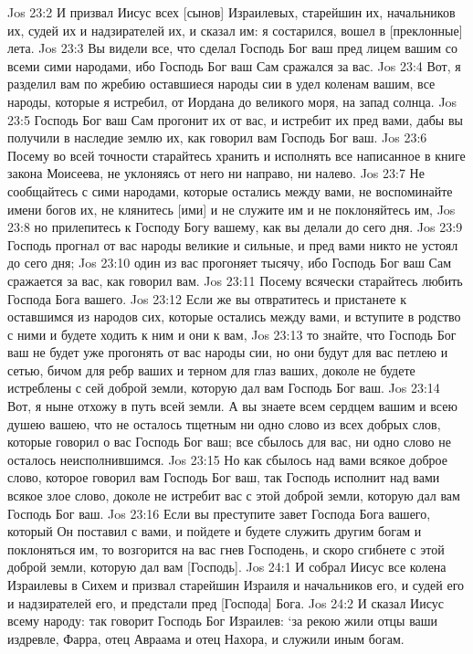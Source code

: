 Jos 23:2  И призвал Иисус всех [сынов] Израилевых, старейшин их, начальников их, судей их и надзирателей их, и сказал им: я состарился, вошел в [преклонные] лета.
Jos 23:3  Вы видели все, что сделал Господь Бог ваш пред лицем вашим со всеми сими народами, ибо Господь Бог ваш Сам сражался за вас.
Jos 23:4  Вот, я разделил вам по жребию оставшиеся народы сии в удел коленам вашим, все народы, которые я истребил, от Иордана до великого моря, на запад солнца.
Jos 23:5  Господь Бог ваш Сам прогонит их от вас, и истребит их пред вами, дабы вы получили в наследие землю их, как говорил вам Господь Бог ваш.
Jos 23:6  Посему во всей точности старайтесь хранить и исполнять все написанное в книге закона Моисеева, не уклоняясь от него ни направо, ни налево.
Jos 23:7  Не сообщайтесь с сими народами, которые остались между вами, не воспоминайте имени богов их, не клянитесь [ими] и не служите им и не поклоняйтесь им,
Jos 23:8  но прилепитесь к Господу Богу вашему, как вы делали до сего дня.
Jos 23:9  Господь прогнал от вас народы великие и сильные, и пред вами никто не устоял до сего дня;
Jos 23:10  один из вас прогоняет тысячу, ибо Господь Бог ваш Сам сражается за вас, как говорил вам.
Jos 23:11  Посему всячески старайтесь любить Господа Бога вашего.
Jos 23:12  Если же вы отвратитесь и пристанете к оставшимся из народов сих, которые остались между вами, и вступите в родство с ними и будете ходить к ним и они к вам,
Jos 23:13  то знайте, что Господь Бог ваш не будет уже прогонять от вас народы сии, но они будут для вас петлею и сетью, бичом для ребр ваших и терном для глаз ваших, доколе не будете истреблены с сей доброй земли, которую дал вам Господь Бог ваш.
Jos 23:14  Вот, я ныне отхожу в путь всей земли. А вы знаете всем сердцем вашим и всею душею вашею, что не осталось тщетным ни одно слово из всех добрых слов, которые говорил о вас Господь Бог ваш; все сбылось для вас, ни одно слово не осталось неисполнившимся.
Jos 23:15  Но как сбылось над вами всякое доброе слово, которое говорил вам Господь Бог ваш, так Господь исполнит над вами всякое злое слово, доколе не истребит вас с этой доброй земли, которую дал вам Господь Бог ваш.
Jos 23:16  Если вы преступите завет Господа Бога вашего, который Он поставил с вами, и пойдете и будете служить другим богам и поклоняться им, то возгорится на вас гнев Господень, и скоро сгибнете с этой доброй земли, которую дал вам [Господь].
Jos 24:1  И собрал Иисус все колена Израилевы в Сихем и призвал старейшин Израиля и начальников его, и судей его и надзирателей его, и предстали пред [Господа] Бога.
Jos 24:2  И сказал Иисус всему народу: так говорит Господь Бог Израилев: `за рекою жили отцы ваши издревле, Фарра, отец Авраама и отец Нахора, и служили иным богам.
